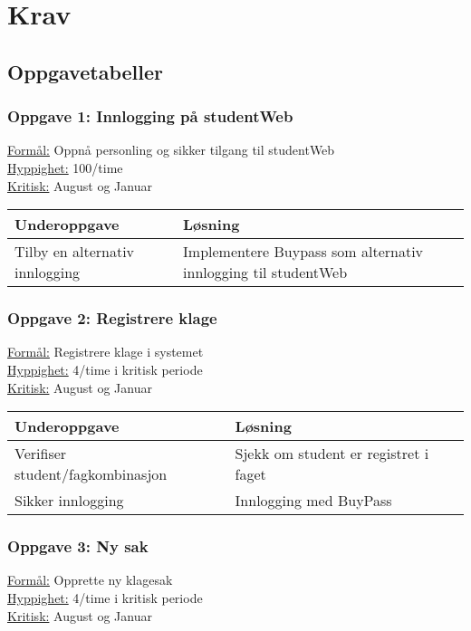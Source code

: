 \section{Krav}

\subsection{Oppgavetabeller}

\subsubsection*{Oppgave 1: Innlogging på studentWeb}

\underline{Formål:} Oppnå personling og sikker tilgang til studentWeb\\
\underline{Hyppighet:} 100/time\\
\underline{Kritisk:} August og Januar

\begin{tabularx}{\textwidth}{|l|X|}
  \hline
  Underoppgave & Løsning \\ \hline
  Tilby en alternativ innlogging & Implementere Buypass som alternativ innlogging til studentWeb \\ \hline
\end{tabularx}

\subsubsection*{Oppgave 2: Registrere klage}

\underline{Formål:} Registrere klage i systemet\\
\underline{Hyppighet:} 4/time i kritisk periode\\
\underline{Kritisk:} August og Januar

\begin{tabularx}{\textwidth}{|l|X|}
  \hline
  Underoppgave & Løsning \\ \hline
  Verifiser student/fagkombinasjon & Sjekk om student er registret i faget \\ \hline
  Sikker innlogging & Innlogging med BuyPass \\ \hline
\end{tabularx}


\subsubsection*{Oppgave 3: Ny sak}

\underline{Formål:} Opprette ny klagesak\\
\underline{Hyppighet:} 4/time i kritisk periode\\
\underline{Kritisk:} August og Januar

